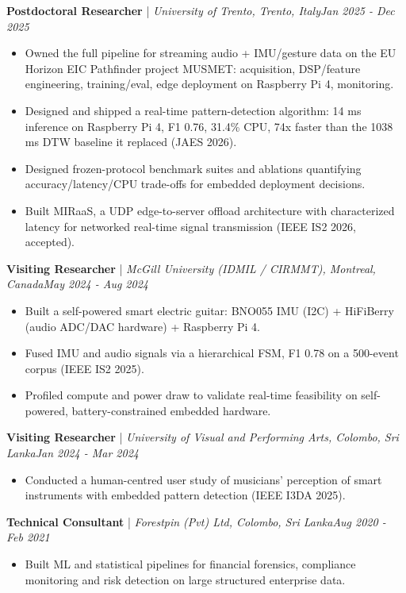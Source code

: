 \documentclass[11pt]{article}
\newenvironment{cvrole}[5]{%
  \par\noindent\textbf{\large #1} | \textit{\small #2, #3}\hfill \textit{\small #4 - #5}\par
  \begin{itemize}[leftmargin=2em, itemsep=-0.3em, topsep=-0.5em]%
}{%
  \end{itemize}\par\noindent\mbox{}\par\vspace{0.1em}%
}
\begin{document}
\begin{cvrole}{Postdoctoral Researcher}{University of Trento}{Trento, Italy}{Jan 2025}{Dec 2025}
\item Owned the full pipeline for streaming audio + IMU/gesture data on the EU Horizon EIC Pathfinder project MUSMET: acquisition, DSP/feature engineering, training/eval, edge deployment on Raspberry Pi 4, monitoring.
\item Designed and shipped a real-time pattern-detection algorithm: 14 ms inference on Raspberry Pi 4, F1 0.76, 31.4\% CPU, 74x faster than the 1038 ms DTW baseline it replaced (JAES 2026).
\item Designed frozen-protocol benchmark suites and ablations quantifying accuracy/latency/CPU trade-offs for embedded deployment decisions.
\item Built MIRaaS, a UDP edge-to-server offload architecture with characterized latency for networked real-time signal transmission (IEEE IS2 2026, accepted).
\end{cvrole}

\begin{cvrole}{Visiting Researcher}{McGill University (IDMIL / CIRMMT)}{Montreal, Canada}{May 2024}{Aug 2024}
\item Built a self-powered smart electric guitar: BNO055 IMU (I2C) + HiFiBerry (audio ADC/DAC hardware) + Raspberry Pi 4.
\item Fused IMU and audio signals via a hierarchical FSM, F1 0.78 on a 500-event corpus (IEEE IS2 2025).
\item Profiled compute and power draw to validate real-time feasibility on self-powered, battery-constrained embedded hardware.
\end{cvrole}

\begin{cvrole}{Visiting Researcher}{University of Visual and Performing Arts}{Colombo, Sri Lanka}{Jan 2024}{Mar 2024}
\item Conducted a human-centred user study of musicians' perception of smart instruments with embedded pattern detection (IEEE I3DA 2025).
\end{cvrole}

\begin{cvrole}{Technical Consultant}{Forestpin (Pvt) Ltd}{Colombo, Sri Lanka}{Aug 2020}{Feb 2021}
\item Built ML and statistical pipelines for financial forensics, compliance monitoring and risk detection on large structured enterprise data.
\end{cvrole}
\end{document}
